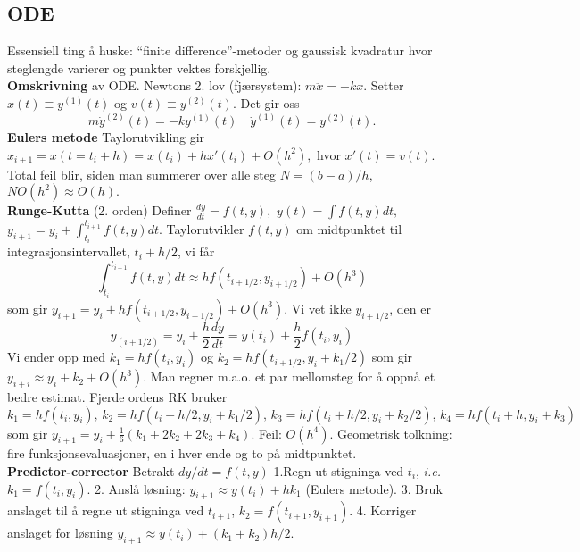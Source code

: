 \documentclass[12pt,a4paper,twocolumn]{article}
\begin{document}
\begin{flushleft}
\subsection{ODE} %
\label{sub:ode}
Essensiell ting å huske: ``finite difference''-metoder og gaussisk kvadratur hvor steglengde varierer og punkter vektes forskjellig.\\
\textbf{Omskrivning} av ODE. Newtons 2. lov (fjærsystem): $m\ddot x = -kx$. Setter $x(t) \equiv y^{(1)}(t)$ og $v(t) \equiv y^{(2)}(t)$. Det gir oss
$$ m\dot y^{(2)}(t) = - ky^{(1)}(t) \quad \dot y^{(1)}(t)=y^{(2)}(t). $$
\textbf{Eulers metode} Taylorutvikling gir $x_{i+1}=x(t=t_i+h)=x(t_i) + hx'(t_i) + O(h^2),$ hvor $x'(t) = v(t)$. Total feil blir, siden man summerer over alle steg $N = (b-a)/h$,  $NO(h^2) \approx O(h).$ \\
\textbf{Runge-Kutta} (2. orden) Definer $\frac{dy}{dt}=f(t,y),$ $y(t)=\int f(t,y) dt,$ $y_{i+1}=y_i+ \int_{t_i}^{t_{i+1}} f(t,y) dt$. Taylorutvikler $f(t,y)$ om midtpunktet til integrasjonsintervallet, $t_i +h/2$, vi får
$$  \int_{t_i}^{t_{i+1}} f(t,y) dt \approx hf(t_{i+1/2},y_{i+1/2}) +O(h^3) $$
som gir $y_{i+1}=y_i + hf(t_{i+1/2},y_{i+1/2}) +O(h^3)$. Vi vet ikke $y_{i+1/2}$, den er
$$ y_{(i+1/2)}=y_i + \frac{h}{2}\frac{dy}{dt} = y(t_i) + \frac{h}{2}f(t_i,y_i) $$
Vi ender opp med $k_1=hf(t_i,y_i)$ og $k_2=hf(t_{i+1/2},y_i+k_1/2)$ som gir $y_{i+i}\approx y_i + k_2 +O(h^3)$. Man regner m.a.o. et par mellomsteg for å oppnå et bedre estimat. Fjerde ordens RK bruker $k_1=hf(t_i,y_i),\, k_2=hf(t_i+h/2,y_i+k_1/2),\,k_3=hf(t_i+h/2,y_i+k_2/2),\,k_4=hf(t_i+h,y_i+k_3)$ som gir $y_{i+1}=y_i +\frac{1}{6}\left( k_1 +2k_2+2k_3+k_4\right).$ Feil: $O(h^4)$. Geometrisk tolkning: fire funksjonsevaluasjoner, en i hver ende og to på midtpunktet.\\
\textbf{Predictor-corrector} Betrakt $dy/dt = f(t,y)$ 1.Regn ut stigninga ved $t_i$, \emph{i.e.} $k_1 = f(t_i,y_i)$. 2. Anslå løsning: $y_{i+1}\approx y(t_i)+hk_1$ (Eulers metode). 3. Bruk anslaget til å regne ut stigninga ved $t_{i+1}$, $k_2=f(t_{i+1},y_{i+1})$. 4. Korriger anslaget for løsning $y_{i+1}\approx y(t_i) + (k_1+k_2)h/2$.



\end{flushleft}
\end{document}
